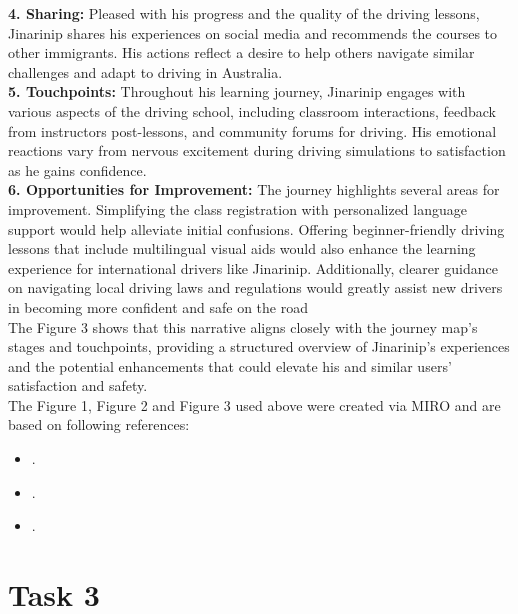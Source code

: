 \documentclass[12pt,a4paper]{article}
\begin{document}
\noindent\textbf{4. Sharing:} Pleased with his progress and the quality of the driving lessons, Jinarinip shares his experiences on social media and recommends the courses to other immigrants. His actions reflect a desire to help others navigate similar challenges and adapt to driving in Australia.
\\

\noindent\textbf{5. Touchpoints:} Throughout his learning journey, Jinarinip engages with various aspects of the driving school, including classroom interactions, feedback from instructors post-lessons, and community forums for driving. His emotional reactions vary from nervous excitement during driving simulations to satisfaction as he gains confidence.\\

\noindent\textbf{6. Opportunities for Improvement:} The journey highlights several areas for improvement. Simplifying the class registration with personalized language support would help alleviate initial confusions. Offering beginner-friendly driving lessons that include multilingual visual aids would also enhance the learning experience for international drivers like Jinarinip. Additionally, clearer guidance on navigating local driving laws and regulations would greatly assist new drivers in becoming more confident and safe on the road\\

\noindent The Figure 3 shows that this narrative aligns closely with the journey map's stages and touchpoints, providing a structured overview of Jinarinip's experiences and the potential enhancements that could elevate his and similar users' satisfaction and safety.\\

\noindent The Figure 1, Figure 2 and Figure 3 used above were created via MIRO and are based on following references:

\begin{itemize}
    \item \cite{question_2.1}.
    \item \cite{question_2.2}.
    \item \cite{question_2.4}.    
\end{itemize}

\pagebreak


\setcounter{page}{6}
\label{sec:Question 3}
\section{Task 3}
\end{document}
